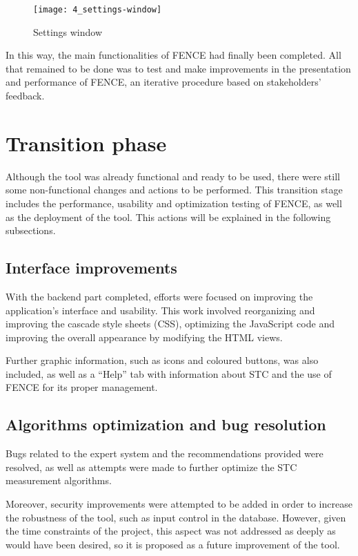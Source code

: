\begin{figure}
	\centering
	\texttt{[image: 4\_settings-window]}
	\caption[Settings window]{Settings window}
	\label{fig:settings}
\end{figure}

In this way, the main functionalities of FENCE had finally been completed. All that remained to be done was to test and make improvements in the presentation and performance of FENCE, an iterative procedure based on stakeholders' feedback.

\section{Transition phase}

Although the tool was already functional and ready to be used, there were still some non-functional changes and actions to be performed. This transition stage includes the performance, usability and optimization testing of FENCE, as well as the deployment of the tool. This actions will be explained in the following subsections.

\subsection{Interface improvements}

With the backend part completed, efforts were focused on improving the application's interface and usability. This work involved reorganizing and improving the cascade style sheets (CSS), optimizing the JavaScript code and improving the overall appearance by modifying the HTML views.

Further graphic information, such as icons and coloured buttons, was also included, as well as a “Help” tab with information about STC and the use of FENCE for its proper management.

\subsection{Algorithms optimization and bug resolution}

Bugs related to the expert system and the recommendations provided were resolved, as well as attempts were made to further optimize the STC measurement algorithms.

Moreover, security improvements were attempted to be added in order to increase the robustness of the tool, such as input control in the database. However, given the time constraints of the project, this aspect was not addressed as deeply as would have been desired, so it is proposed as a future improvement of the tool.

